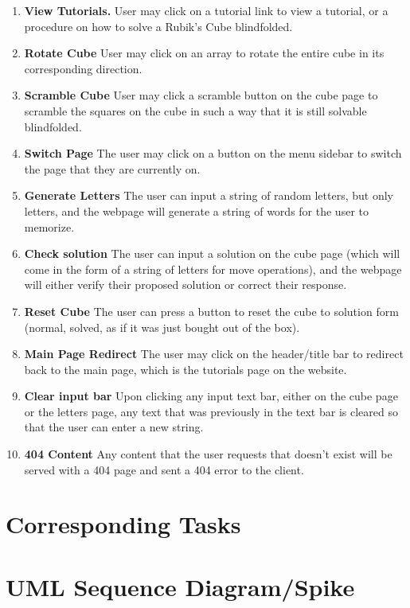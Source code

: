 \documentclass[12pt]{article}
\begin{document}
\begin{enumerate}
	\item \textbf{View Tutorials.} User may click on a tutorial link to view a tutorial, or a procedure on how to solve a Rubik’s Cube blindfolded.
	\item \textbf{Rotate Cube} User may click on an array to rotate the entire cube in its corresponding direction.
	\item \textbf{Scramble Cube} User may click a scramble button on the cube page to scramble the squares on the cube in such a way that it is still solvable blindfolded.
	\item \textbf{Switch Page} The user may click on a button on the menu sidebar to switch the page that they are currently on.
	\item \textbf{Generate Letters} The user can input a string of random letters, but only letters, and the webpage will generate a string of words for the user to memorize.
	\item \textbf{Check solution} The user can input a solution on the cube page (which will come in the form of a string of letters for move operations), and the webpage will either verify their proposed solution or correct their response.
	\item \textbf{Reset Cube} The user can press a button to reset the cube to solution form (normal, solved, as if it was just bought out of the box).
	\item \textbf{Main Page Redirect} The user may click on the header/title bar to redirect back to the main page, which is the tutorials page on the website.
	\item \textbf{Clear input bar} Upon clicking any input text bar, either on the cube page or the letters page, any text that was previously in the text bar is cleared so that the user can enter a new string.
	\item \textbf{404 Content} Any content that the user requests that doesn’t exist will be served with a 404 page and sent a 404 error to the client.
\end{enumerate}
	
\section{Corresponding Tasks}


\section{UML Sequence Diagram/Spike}
\end{document}
